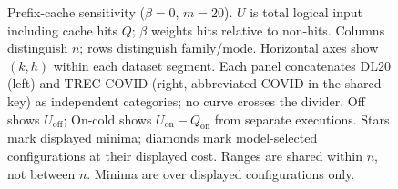 \begin{figure}[t]
\endgroup
\caption{Prefix-cache sensitivity ($\beta=0$, $m=20$). $U$ is total logical input including cache hits $Q$; $\beta$ weights hits relative to non-hits. Columns distinguish $n$; rows distinguish family/mode. Horizontal axes show $(k,h)$ within each dataset segment. Each panel concatenates DL20 (left) and TREC-COVID (right, abbreviated COVID in the shared key) as independent categories; no curve crosses the divider. Off shows $U_{\mathrm{off}}$; On-cold shows $U_{\mathrm{on}}-Q_{\mathrm{on}}$ from separate executions. Stars mark displayed minima; diamonds mark model-selected configurations at their displayed cost. Ranges are shared within $n$, not between $n$. Minima are over displayed configurations only.}
\label{fig:e4a-c2}
\end{figure}
